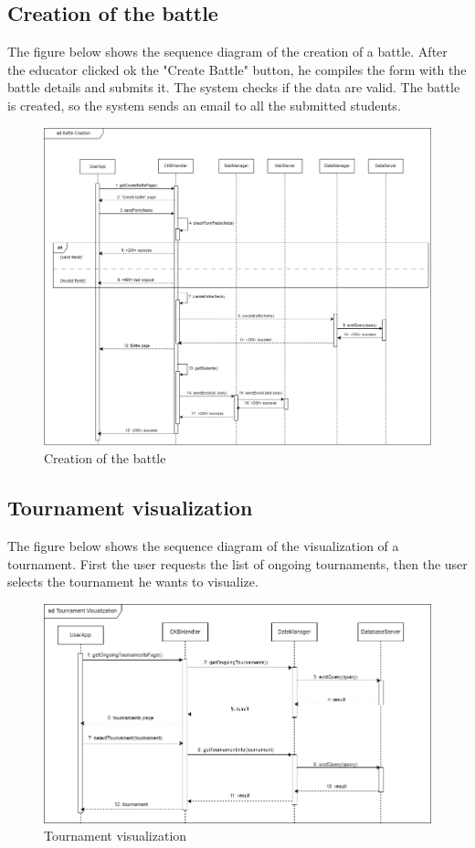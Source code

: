 \subsection{Creation of the battle}
The figure below shows the sequence diagram of the creation of a battle. After the educator clicked ok the "Create Battle" button, he compiles the form
 with the battle details and submits it. The system checks if the data are valid. The battle is created, so the system sends an email to all 
 the submitted students.  
 
\begin{figure}[H]
    \centering
    \includegraphics[width=1\textwidth]{images/seq_diagrams/battle_creation_DD.png}
    \caption{Creation of the battle}
\end{figure}

\subsection{Tournament visualization}
The figure below shows the sequence diagram of the visualization of a tournament. First the user requests the list of ongoing tournaments, 
then the user selects the tournament he wants to visualize.\\
\begin{figure}[H]
    \centering
    \includegraphics[width=1\textwidth]{images/seq_diagrams/tournament_visualization_dd.png}
    \caption{Tournament visualization}
\end{figure}

